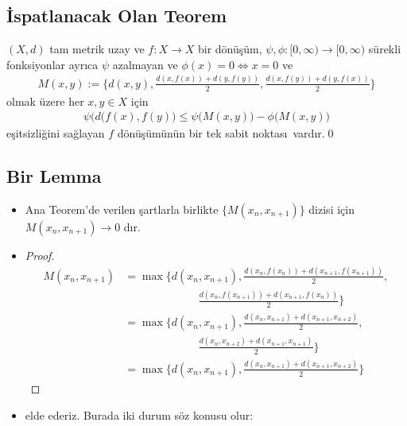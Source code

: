 \documentclass[8pt]{beamer}
\begin{document}
\subsection{\.{I}spatlanacak Olan Teorem}
\begin{frame}
  \begin{theorem}
    $(X,d)$  tam metrik uzay ve $f: X \rightarrow X$ bir d\"{o}n\"{u}\c{s}\"{u}m, $\psi,\phi : [0,\infty)\to [0,\infty)$ s\"urekli fonksiyonlar ayr\i ca $\psi$ azalmayan ve $\phi(x)=0 \iff x=0$ ve
    \begin{align}
M(x,y):=\bigg\{ d(x,y), \frac{d(x,f(x))+d(y,f(y))}{2}, \frac{d(x,f(y))+d(y,f(x))}{2} \bigg\}
    \end{align}
olmak \"{u}zere her $x,y \in X$ i\c{c}in
\begin{align}
\psi\big(d(f(x),f(y)\big)\leq \psi\big(M(x,y)\big)-\phi\big(M(x,y)\big)
\end{align}
e\c{s}itsizli\u{g}ini sa\u{g}layan $f$ d\"{o}n\"{u}\c{s}\"{u}m\"un\"un bir tek sabit noktas\i\ vard\i r.\qed 
  \end{theorem}
\end{frame}%


\subsection{Bir Lemma}
\begin{frame}
\begin{itemize}[<+-| alert@+>]  

  \item[] 
  \begin{lemma}
    Ana Teorem'de verilen \c{s}artlarla birlikte $\{M(x_n,x_{n+1})\}$ dizisi i\c{c}in $M(x_n,x_{n+1})\rightarrow 0$ d\i r.
  \end{lemma}

  \item[] 
    \begin{proof}
      \begin{align*}
          M(x_n,x_{n+1})&=\max\bigg\{
          d(x_n,x_{n+1}),\frac{d(x_n,f(x_n))+d(x_{n+1},f(x_{n+1}))}{2},\\
          &\hspace{80pt} \frac{d(x_n,f(x_{n+1}))+d(x_{n+1},f(x_{n}))}{2} \bigg\}\\
          &=\max\bigg\{
          d(x_n,x_{n+1}),\frac{d(x_n,x_{n+1})+d(x_{n+1},x_{n+2})}{2},\\
          &\hspace{80pt} \frac{d(x_n,x_{n+2})+d(x_{n+1},x_{n+1})}{2} \bigg\}\\
          &=\max\bigg\{
          d(x_n,x_{n+1}),\frac{d(x_n,x_{n+1})+d(x_{n+1},x_{n+2})}{2}\bigg\}
      \end{align*}
    \end{proof}

  \item[] elde ederiz. Burada iki durum s\"oz konusu olur:
\end{itemize}
\end{frame}%
\end{document}
